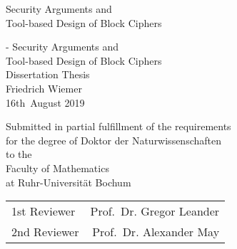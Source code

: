 \thispagestyle{empty}
{
    \begin{fullwidth}
        \centering
        \hphantom{.}
        \vfill
        {\Huge
            Security Arguments and\\
            Tool-based Design of Block Ciphers
        }
        \vfill
        \vfill
    \end{fullwidth}
}

\clearpage{}

\cleardoublepage{}

\thispagestyle{empty}
{
    \calccentering{\unitlength}
    \begin{adjustwidth*}{\unitlength}{-\unitlength}
        \raggedleft{}
        {\Huge\color{Burgundy}%
        Security Arguments and\\
        Tool-based Design of Block Ciphers}\\[\baselineskip]
        {\LARGE%
        Dissertation Thesis}\\[0.2\textheight]
        {\huge%
        Friedrich Wiemer}\\[\baselineskip]
        {\LARGE%
        16th~August 2019}
        \vfill
        \vfill
        {\large%
        Submitted in partial fulfillment of the requirements\\
        for the degree of Doktor der Naturwissenschaften\\[\baselineskip]%

        to the\\[\baselineskip]

        Faculty of Mathematics\\
        at Ruhr-Universität Bochum\\[2\baselineskip]

        \begin{minipage}{0.5\textwidth}
        \begin{tabular}{lr}
            1st\hspace{4pt} Reviewer & Prof.\ Dr. Gregor Leander\\
            2nd Reviewer & Prof.\ Dr.\; Alexander May
        \end{tabular}
        \end{minipage}
        \hspace*{36pt}

        \vfill
        }
        \vspace*{\baselineskip}
    \end{adjustwidth*}
}

